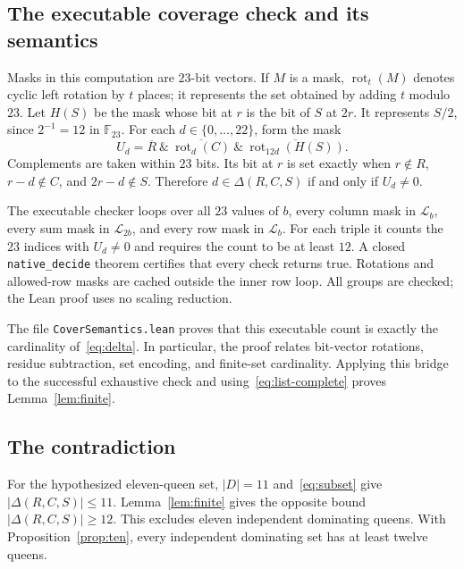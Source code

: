 \documentclass[11pt,a4paper]{article}
\theoremstyle{remark}
\newcommand{\F}{\mathbb F_{23}}
\newcommand{\card}[1]{\lvert#1\rvert}
\begin{document}
\subsection{The executable coverage check and its semantics}
Masks in this computation are $23$-bit vectors. If $M$ is a mask,
$\operatorname{rot}_t(M)$ denotes cyclic left rotation by $t$ places;
it represents the set obtained by adding $t$ modulo $23$.
Let $H(S)$ be the mask whose bit at $r$ is the bit of $S$ at $2r$.
It represents $S/2$, since $2^{-1}=12$ in $\F$.
For each $d\in\{0,\ldots,22\}$, form the mask
\begin{equation}\label{eq:bitcheck}
 U_d=\overline R\ \mathbin{\&}\ 
       \overline{\operatorname{rot}_d(C)}\ \mathbin{\&}\ 
       \overline{\operatorname{rot}_{12d}(H(S))}.
\end{equation}
Complements are taken within $23$ bits.
Its bit at $r$ is set exactly when
$r\notin R$, $r-d\notin C$, and $2r-d\notin S$.
Therefore $d\in\Delta(R,C,S)$ if and only if $U_d\ne0$.

The executable checker loops over all $23$ values of $b$, every column mask
in $\mathcal L_b$, every sum mask in $\mathcal L_{2b}$, and every row mask in
$\mathcal L_b$. For each triple it counts the $23$ indices with $U_d\ne0$
and requires the count to be at least $12$. A closed
\texttt{native\_decide} theorem certifies that every check returns true.
Rotations and allowed-row masks are cached outside the inner row loop.
All groups are checked; the Lean proof uses no scaling reduction.

The file \texttt{CoverSemantics.lean} proves that this executable count is
exactly the cardinality of~\eqref{eq:delta}. In particular, the proof relates
bit-vector rotations, residue subtraction, set encoding, and finite-set
cardinality. Applying this bridge to the successful exhaustive check and
using~\eqref{eq:list-complete} proves Lemma~\ref{lem:finite}.

\subsection{The contradiction}
For the hypothesized eleven-queen set, $\card D=11$ and~\eqref{eq:subset} give
$\card{\Delta(R,C,S)}\leq11$. Lemma~\ref{lem:finite} gives the opposite bound
$\card{\Delta(R,C,S)}\geq12$. This excludes eleven independent dominating
queens. With Proposition~\ref{prop:ten}, every independent dominating set has
at least twelve queens.
\end{document}
